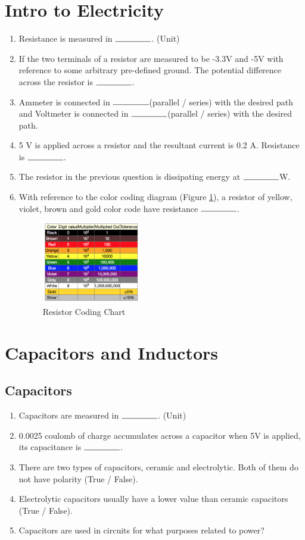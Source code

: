 \documentclass{article}
\newcommand{\ans}{$\rule{1.5cm}{0.15mm}$}
\begin{document}
\section{Intro to Electricity}
\begin{enumerate}
	\item Resistance is measured in \ans. (Unit)
	\item If the two terminals of a resistor are measured to be -3.3V and -5V with reference to some arbitrary pre-defined ground. The potential difference across the resistor is \ans.
	\item Ammeter is connected in \ans (parallel / series) with the desired path and Voltmeter is connected in \ans (parallel / series) with the desired path.
	\item 5 V is applied across a resistor and the resultant current is 0.2 A. Resistance is \ans.
	\item The resistor in the previous question is dissipating energy at \ans W.
	\item With reference to the color coding diagram (Figure \ref{fig:Resistor}), a resistor of yellow, violet, brown and gold color code have resistance \ans.
	\begin{figure}
		\center
		\includegraphics[width=0.4\textwidth, keepaspectratio]{rcolorcoding}
		\caption{Resistor Coding Chart}
		\label{fig:Resistor}
	\end{figure}
\end{enumerate}

\section{Capacitors and Inductors}
\subsection{Capacitors}
\begin{enumerate}
	\item Capacitors are measured in \ans. (Unit)
	\item 0.0025 coulomb of charge accumulates across a capacitor when 5V is applied, its capacitance is \ans.
	\item There are two types of capacitors, ceramic and electrolytic. Both of them do not have polarity (True / False).
	\item Electrolytic capacitors usually have a lower value than ceramic capacitors (True / False).
	\item Capacitors are used in circuits for what purposes related to power?
\end{enumerate}
\end{document}
